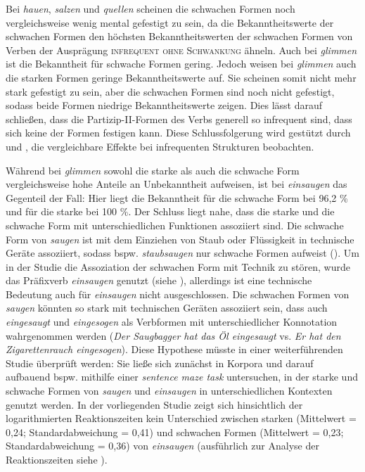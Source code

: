 Bei \textit{hauen}, \textit{salzen} und \textit{quellen} scheinen die schwachen Formen noch vergleichsweise wenig mental gefestigt zu sein, da die Bekanntheitswerte der schwachen Formen den höchsten Bekanntheitswerten der schwachen Formen von Verben der Ausprägung \textsc{infrequent ohne Schwankung} ähneln. Auch bei \textit{glimmen} ist die Bekanntheit für schwache Formen gering. Jedoch weisen bei \textit{glimmen} auch die starken Formen geringe Bekanntheitswerte auf. Sie scheinen somit nicht mehr stark gefestigt zu sein, aber die schwachen Formen sind noch nicht gefestigt, sodass beide Formen niedrige Bekanntheitswerte zeigen. Dies lässt darauf schließen, dass die Partizip-II-Formen des Verbs generell so infrequent sind, dass sich keine der Formen festigen kann. Diese Schlussfolgerung wird gestützt durch \textcite{Cappellaro.2013} und \textcite{Thornton.2019}, die vergleichbare Effekte bei infrequenten Strukturen beobachten.



Während bei \textit{glimmen} sowohl die starke als auch die schwache Form vergleichsweise hohe Anteile an Unbekanntheit aufweisen, ist bei \textit{einsaugen} das Gegenteil der Fall: Hier liegt die Bekanntheit für die schwache Form bei 96,2 \%  und für die starke bei 100 \%. Der Schluss liegt nahe, dass die starke und die schwache Form mit unterschiedlichen Funktionen assoziiert sind. Die schwache Form von \textit{saugen} ist mit dem Einziehen von Staub oder Flüssigkeit in technische Geräte assoziiert, sodass bspw. \textit{staubsaugen} nur schwache Formen aufweist (\cite[316--322]{Nowak.2013, Duden.2020}). Um in der Studie die Assoziation der schwachen Form mit Technik zu stören, wurde das Präfixverb \textit{einsaugen} genutzt (siehe ), allerdings ist eine technische Bedeutung auch für \textit{einsaugen} nicht ausgeschlossen. Die schwachen Formen von \textit{saugen} könnten so stark mit technischen Geräten assoziiert sein, dass auch \textit{eingesaugt} und \textit{eingesogen} als Verbformen mit unterschiedlicher Konnotation wahrgenommen werden (\textit{Der Saugbagger hat das Öl eingesaugt} vs. \textit{Er hat den Zigarettenrauch eingesogen}). Diese Hypothese müsste in einer weiterführenden Studie überprüft werden: Sie ließe sich zunächst in Korpora und darauf aufbauend bspw. mithilfe einer \textit{sentence maze task} untersuchen, in der starke und schwache Formen von \textit{saugen} und \textit{einsaugen} in unterschiedlichen Kontexten genutzt werden. In der vorliegenden Studie zeigt sich hinsichtlich der logarithmierten Reaktionszeiten kein Unterschied zwischen starken (Mittelwert = 0,24; Standardabweichung = 0,41) und schwachen Formen (Mittelwert = 0,23; Standardabweichung = 0,36) von \textit{einsaugen} (ausführlich zur Analyse der Reaktionszeiten siehe ). 

